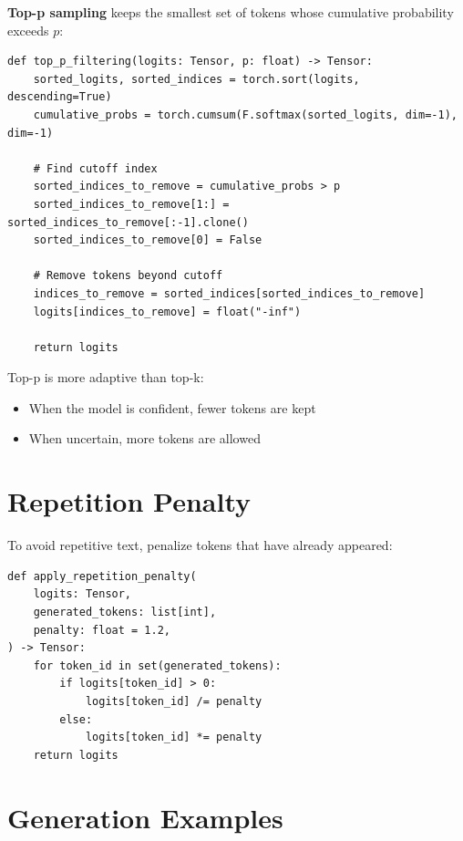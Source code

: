 \textbf{Top-p sampling} keeps the smallest set of tokens whose cumulative probability exceeds $p$:

\begin{lstlisting}[style=python, caption={Top-p filtering from generate.py}]
def top_p_filtering(logits: Tensor, p: float) -> Tensor:
    sorted_logits, sorted_indices = torch.sort(logits, descending=True)
    cumulative_probs = torch.cumsum(F.softmax(sorted_logits, dim=-1), dim=-1)

    # Find cutoff index
    sorted_indices_to_remove = cumulative_probs > p
    sorted_indices_to_remove[1:] = sorted_indices_to_remove[:-1].clone()
    sorted_indices_to_remove[0] = False

    # Remove tokens beyond cutoff
    indices_to_remove = sorted_indices[sorted_indices_to_remove]
    logits[indices_to_remove] = float("-inf")

    return logits
\end{lstlisting}

\begin{keypoint}
Top-p is more adaptive than top-k:
\begin{itemize}
    \item When the model is confident, fewer tokens are kept
    \item When uncertain, more tokens are allowed
\end{itemize}
\end{keypoint}

\section{Repetition Penalty}

To avoid repetitive text, penalize tokens that have already appeared:

\begin{lstlisting}[style=python]
def apply_repetition_penalty(
    logits: Tensor,
    generated_tokens: list[int],
    penalty: float = 1.2,
) -> Tensor:
    for token_id in set(generated_tokens):
        if logits[token_id] > 0:
            logits[token_id] /= penalty
        else:
            logits[token_id] *= penalty
    return logits
\end{lstlisting}

\section{Generation Examples}

